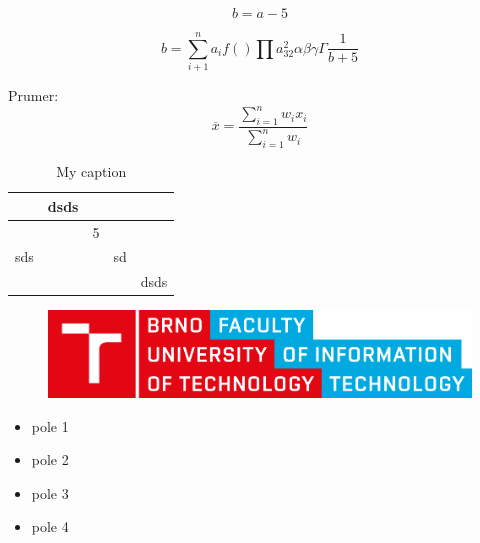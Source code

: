 \documentclass{report}
\begin{document}
	$$ b = a - 5 $$
	 
	\begin{equation}
		b = \sum^{n}_{i + 1} a_i f() \prod a^2_{32}
		\alpha \beta \gamma \Gamma
		\frac{1}{b + 5}
	\end{equation}
	 
	Prumer:
	\begin{equation}
		\overline{x} = \frac{\sum\limits^{n}_{i = 1} w_i x_i}{\sum\limits^{n}_{i = 1} w_i}
	\end{equation}

	\begin{table}[h]
		\centering
		\caption{My caption}
		\label{my-label}
		\begin{tabular}{lllll}
								  & dsds                  &                        &                         &                           \\ \hline
		\multicolumn{1}{|l|}{}    & \multicolumn{1}{l|}{} & \multicolumn{1}{l|}{5} & \multicolumn{1}{l|}{}   & \multicolumn{1}{l|}{}     \\ \hline
		\multicolumn{1}{|l|}{sds} & \multicolumn{1}{l|}{} & \multicolumn{1}{l|}{}  & \multicolumn{1}{l|}{sd} & \multicolumn{1}{l|}{}     \\ \hline
		\multicolumn{1}{|l|}{}    & \multicolumn{1}{l|}{} & \multicolumn{1}{l|}{}  & \multicolumn{1}{l|}{}   & \multicolumn{1}{l|}{dsds} \\ \hline
		\end{tabular}
	\end{table}
	
	\begin{figure}[b]
		\begin{center}
			\includegraphics[width=0.3\linewidth]{VUT-FIT-logo.pdf}
		\end{center}
	\end{figure}
	
	\begin{itemize}
		\item{pole 1}
		\item{pole 2}
		\item{pole 3}
		\item{pole 4}
	\end{itemize}
\end{document}
